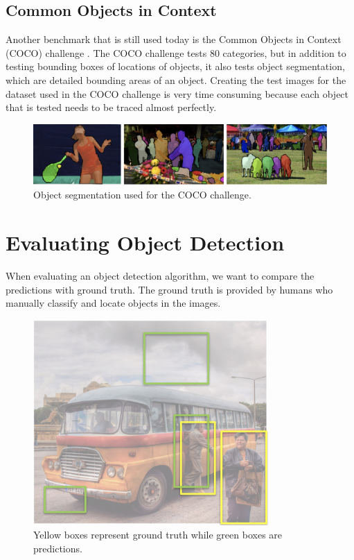 \documentclass{article}
\begin{document}
\subsection{Common Objects in Context}
Another benchmark that is still used today is the Common Objects in Context (COCO) challenge \cite{DBLP:journals/corr/LinMBHPRDZ14}. The COCO challenge tests 80 categories, but in addition to testing bounding boxes of locations of objects, it also tests object segmentation, which are detailed bounding areas of an object. Creating the test images for the dataset used in the COCO challenge is very time consuming because each object that is tested needs to be traced almost perfectly.

\begin{figure}[h]
	\includegraphics[width=\textwidth]{coco.png}
    \caption{Object segmentation used for the COCO challenge.}
\end{figure}

\pagebreak

\section{Evaluating Object Detection}

When evaluating an object detection algorithm, we want to compare the predictions with ground truth. The ground truth is provided by humans who manually classify and locate objects in the images.

\begin{figure}[ht]
\centering
	\includegraphics[width=0.8\textwidth]{predict_truth.jpg}
    \caption{Yellow boxes represent ground truth while green boxes are predictions.}
\end{figure}
\end{document}

